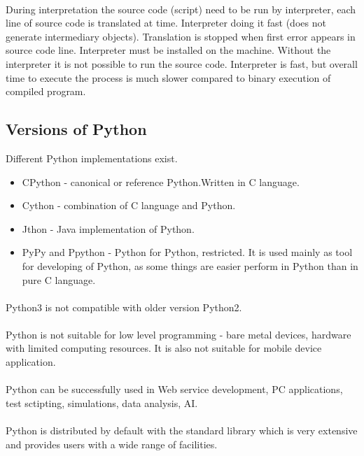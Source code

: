 \documentclass{article}
\begin{document}
	\paragraph{}
	During interpretation the source code (script) need to be run by interpreter, each line of source code is translated at time. Interpreter doing it fast (does not generate intermediary objects). Translation is stopped when first error appears in source code line. Interpreter must be installed on the machine. Without the interpreter it is not possible to run the source code. Interpreter is fast, but overall time to execute the process is much slower compared to binary execution of compiled program.
	
	
	\newpage
	\subsection{Versions of Python}
	Different Python implementations exist.
	\begin{itemize}
	\item CPython - canonical or reference Python.Written in C language.
	\item Cython - combination of C language and Python.
	\item Jthon - Java implementation of Python.
	\item PyPy and Ppython - Python for Python, restricted. It is used mainly as tool for developing of Python, as some things are easier perform in Python than in pure C language.
	\end{itemize}
	\paragraph{}
	Python3 is not compatible with older version Python2.
	\paragraph{}
	Python is not suitable for low level programming - bare metal devices, hardware with limited computing resources. It is also not suitable for mobile device application.
	\paragraph{}
	Python can be successfully used in Web service development, PC applications, test sctipting, simulations, data analysis, AI.
	\paragraph{}
	Python is distributed by default with the standard library which is very extensive and provides users with a wide range of facilities.
	
\end{document}

